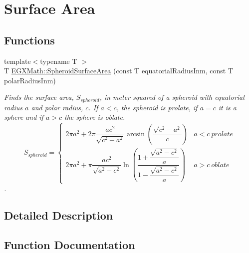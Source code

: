 \hypertarget{group___e_g_x_math-_geometry-3_d-_spheroid-_surface_area}{}\section{Surface Area}
\label{group___e_g_x_math-_geometry-3_d-_spheroid-_surface_area}
\subsection*{Functions}
\begin{DoxyCompactItemize}
\item 
{\footnotesize template$<$typename T $>$ }\\T \mbox{\hyperlink{group___e_g_x_math-_geometry-3_d-_spheroid-_surface_area_ga5a3580e7ded82cb678a558905f41ae49}{E\+G\+X\+Math\+::\+Spheroid\+Surface\+Area}} (const T equatorial\+Radius\+Inm, const T polar\+Radius\+Inm)
\begin{DoxyCompactList}\small\item\em Finds the surface area, $S_{spheroid}$, in meter squared of a spheroid with equatorial radius $a$ and polar radius, $c$. If $a < c$, the spheroid is prolate, if $a = c$ it is a sphere and if $a>c$ the sphere is oblate. \[ S_{spheroid}=\begin{cases} 2\pi a^2 + 2\pi\dfrac{a c^2}{\sqrt{c^2-a^2}}\arcsin \left ( \dfrac{\sqrt{c^2-a^2}}{c} \right ) & a<c\ prolate \\ 2\pi a^2 +\pi \dfrac{a c^2}{\sqrt{a^2-c^2}}\ln \left(\dfrac{1+\dfrac{\sqrt{a^2-c^2}}{a}}{1-\dfrac{\sqrt{a^2-c^2}}{a}}\right )& a>c\ oblate \end{cases} \]. \end{DoxyCompactList}\end{DoxyCompactItemize}


\subsection{Detailed Description}


\subsection{Function Documentation}
\mbox{\label{group___e_g_x_math-_geometry-3_d-_spheroid-_surface_area_ga5a3580e7ded82cb678a558905f41ae49}} 
